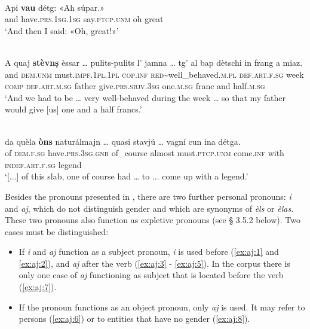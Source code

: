 \ea

\\
\gll Api \textbf{vau} détg: «Ah súpar.»   \\
and have.\textsc{prs.1sg.1sg} say.\textsc{ptcp.unm} oh great\\
\glt `And then I said: «Oh, great!»'
\z

\ea

\\
\gll    A quaj \textbf{stèvnṣ} èssar … pulits-pulits l’ jamna … tg’ al bap dètschi in frang a miaz.\\
and \textsc{dem.unm} must.\textsc{impf.1pl.1pl} \textsc{cop.inf} {} \textsc{red}\textasciitilde{well\_behaved}.\textsc{m.pl} \textsc{def.art.f.sg} week {} \textsc{comp} \textsc{def.art.m.sg} father  give.\textsc{prs.sbjv.3sg} one.\textsc{m.sg} franc and half.\textsc{m.sg}\\
\glt `And we had to be … very well-behaved during the week … so that my father would give [us] one and a half francs.'
\z

\ea

\\
\gll    [...] da quèla \textbf{òns} naturálmajn … quasi stavjú … vagní cun ina détga.\\
{} of \textsc{dem.f.sg} have.\textsc{prs.3sg.gnr} of\_course almost must.\textsc{ptcp.unm} {} come.\textsc{inf} with \textsc{indef.art.f.sg} legend\\
\glt `[...] of this slab, one of course had … to ... come up with a legend.'
\z

Besides the pronouns presented in , there are two further personal pronouns: \textit{i} and \textit{aj}, which do not distinguish gender and which are synonyms of \textit{èls} or \textit{èlas}. These two pronouns also function as expletive pronouns (see § 3.5.2 below). Two cases must be distinguished:

\begin{itemize}
\item If \textit{i} and \textit{aj} function as a subject pronoun, \textit{i} is used before (\ref{ex:aj:1} and \ref{ex:aj:2}), and \textit{aj} after the verb (\ref{ex:aj:3} - \ref{ex:aj:5}). In the corpus there is only one case of \textit{aj} functioning as subject that is located before the verb (\ref{ex:aj:7}).
\item If the pronoun functions as an object pronoun, only \textit{aj} is used. It may refer to persons (\ref{ex:aj:6}) or to entities that have no gender (\ref{ex:aj:8}).
\end{itemize}

